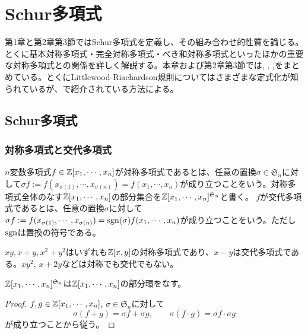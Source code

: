 \documentclass{ltjsreport}
\begin{document}
\chapter{Schur多項式}
第1章と第2章第3節ではSchur多項式を定義し、その組み合わせ的性質を論じる。とくに基本対称多項式・完全対称多項式・べき和対称多項式といったほかの重要な対称多項式との関係を詳しく解説する。本章および第2章第3節では\cite{enu_geo}, \cite{young_tableau}, \cite{macdonald},\cite{sym_func}をまとめている。とくにLittlewood-Riachardson規則についてはさまざまな定式化が知られているが、\cite{enu_geo}で紹介されている方法による。


\section{Schur多項式}
\subsection{対称多項式と交代多項式}
\begin{defin}
    $n$変数多項式$f\in\mathbb{Z}[x_1,\cdots,x_n]$が対称多項式であるとは、任意の置換$\sigma\in\mathfrak{S}_n$に対して$\sigma f:=f(x_{\sigma(1)},\cdots,x_{\sigma(n)})=f(x_1,\cdots,x_n)$が成り立つことをいう。対称多項式全体のなす$\mathbb{Z}[x_1,\cdots,x_n]$の部分集合を$\mathbb{Z}[x_1,\cdots,x_n]^{\mathfrak{S}_n}$と書く。
    $f$が交代多項式であるとは、任意の置換$\sigma$に対して$\sigma f:=f(x_{\sigma(1)},\cdots,x_{\sigma(n)})=\mathrm{sgn}(\sigma)f(x_1,\cdots,x_n)$が成り立つことをいう。ただし$\mathrm{sgn}$は置換の符号である。
\end{defin}

\begin{eg}
    $xy, x+y, x^2+y^2$はいずれも$\mathbb{Z}[x,y]$の対称多項式であり、$x-y$は交代多項式である。$xy^2$, $x+2y$などは対称でも交代でもない。
\end{eg}

\begin{prop}
    $\mathbb{Z}[x_1,\cdots,x_n]^{\mathfrak{S}_n}$は$\mathbb{Z}[x_1,\cdots,x_n]$の部分環をなす。
\end{prop}

\begin{proof}
    $f,g\in\mathbb{Z}[x_1,\cdots,x_n]$, $\sigma\in\mathfrak{S}_n$に対して
    \[
    \sigma(f+g)=\sigma f+\sigma g,\qquad \sigma(f\cdot g)=\sigma f\cdot \sigma g    
    \]
    が成り立つことから従う。
\end{proof}
\end{document}
